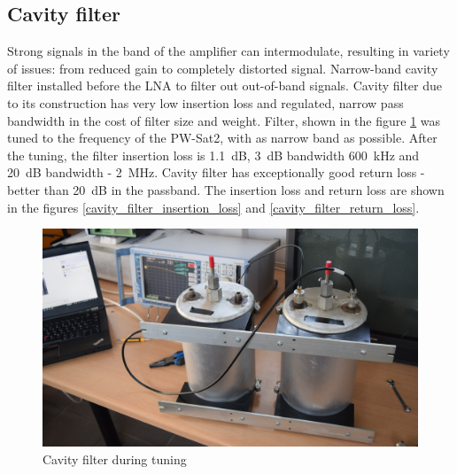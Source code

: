 \subsection{Cavity filter}
Strong signals in the band of the amplifier can intermodulate, resulting in variety of issues: from reduced gain to completely distorted signal. Narrow-band cavity filter installed before the LNA to filter out out-of-band signals. Cavity filter due to its construction has very low insertion loss and regulated, narrow pass bandwidth in the cost of filter size and weight. Filter, shown in the figure \ref{cavity_filter_during_tuning} was tuned to the frequency of the PW-Sat2, with as narrow band as possible. After the tuning, the filter insertion loss is \SI{1.1}{\dB}, \SI{3}{\dB} bandwidth \SI{600}{\kHz} and \SI{20}{\dB} bandwidth - \SI{2}{\MHz}. Cavity filter has exceptionally good return loss - better than \SI{20}{\dB} in the passband. The insertion loss and return loss are shown in the figures \ref{cavity_filter_insertion_loss} and \ref{cavity_filter_return_loss}.

\begin{figure}
    \centering
    \includegraphics[width=0.5\paperwidth]{img/5/cavity_filter_during_tuning.jpg}
    \caption{Cavity filter during tuning}
    \label{cavity_filter_during_tuning}
\end{figure}

